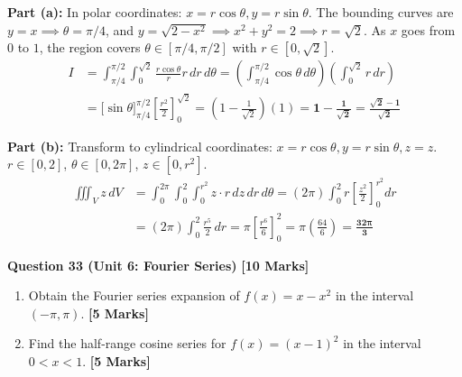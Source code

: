 \begin{solbox}
\textbf{Part (a):}
In polar coordinates: $x = r\cos\theta, y = r\sin\theta$.
The bounding curves are $y = x \implies \theta = \pi/4$, and $y = \sqrt{2-x^2} \implies x^2+y^2 = 2 \implies r = \sqrt{2}$.
As $x$ goes from $0$ to $1$, the region covers $\theta \in [\pi/4, \pi/2]$ with $r \in [0, \sqrt{2}]$.
\begin{align}
I &= \int_{\pi/4}^{\pi/2} \int_0^{\sqrt{2}} \frac{r\cos\theta}{r} r\,dr\,d\theta = \left( \int_{\pi/4}^{\pi/2} \cos\theta\,d\theta \right) \left( \int_0^{\sqrt{2}} r\,dr \right) \\
&= \Big[ \sin\theta \Big]_{\pi/4}^{\pi/2} \left[ \frac{r^2}{2} \right]_0^{\sqrt{2}} = \left( 1 - \frac{1}{\sqrt{2}} \right) (1) = \mathbf{1 - \frac{1}{\sqrt{2}} = \frac{\sqrt{2}-1}{\sqrt{2}}}
\end{align}

\textbf{Part (b):}
Transform to cylindrical coordinates: $x = r\cos\theta, y = r\sin\theta, z = z$.
$r \in [0, 2]$, $\theta \in [0, 2\pi]$, $z \in [0, r^2]$.
\begin{align}
\iiint_V z\,dV &= \int_0^{2\pi} \int_0^2 \int_0^{r^2} z \cdot r\,dz\,dr\,d\theta = (2\pi) \int_0^2 r \left[ \frac{z^2}{2} \right]_0^{r^2} dr \\
&= (2\pi) \int_0^2 \frac{r^5}{2}\,dr = \pi \left[ \frac{r^6}{6} \right]_0^2 = \pi \left( \frac{64}{6} \right) = \mathbf{\frac{32\pi}{3}}
\end{align}
\end{solbox}

\vspace{4mm}
\noindent\textbf{Question 33 (Unit 6: Fourier Series)} \hfill \textbf{[10 Marks]}
\begin{enumerate}[label=(\alph*),topsep=2pt,itemsep=2pt]
    \item Obtain the Fourier series expansion of $f(x) = x - x^2$ in the interval $(-\pi, \pi)$. \hfill \textbf{[5 Marks]}
    \item Find the half-range cosine series for $f(x) = (x-1)^2$ in the interval $0 < x < 1$. \hfill \textbf{[5 Marks]}
\end{enumerate}

